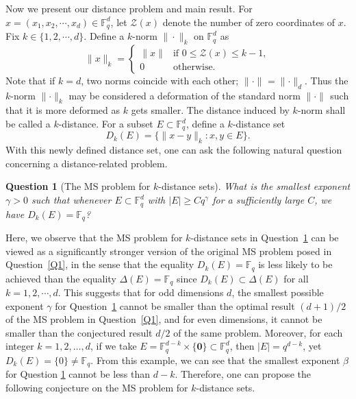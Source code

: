 \documentclass[a4paper,11pt]{amsart}
\numberwithin{equation}{section}
\newtheorem{question}[theorem]{Question}
\def\Fq#1{\mathbb{F}_q^{#1}}
\def\knorm#1#2{\lVert#2\rVert_{#1}}
\begin{document}
Now we present our distance problem and main result.
For $ x = (x_1, x_2, \cdots, x_d) \in \mathbb{F}_q^d $, let $\mathcal{Z}(x)$ denote the number of zero coordinates of $ x $. Fix $k \in \{1, 2, \cdots, d\}$. Define a $k$-norm $\|\cdot\|_{k}$ on $\Fq{d}$ as
\begin{equation}\label{kdst}
\|x\|_{k} = 
\begin{cases}
\|x\| & \text{if } 0 \leq \mathcal{Z}(x) \leq k-1, \\
0 & \text{otherwise.}
\end{cases}
\end{equation}
Note that if $k=d$, two norms coincide with each other; 
$\knorm{}{\cdot} = \knorm{d}{\cdot}$. Thus the $k$-norm $\knorm{k}{\cdot}$ may be considered a deformation of the standard norm $\knorm{}{\cdot}$ such that  it is more deformed as $k$ gets smaller.
The distance induced by $k$-norm shall be called a $k$-distance.
For a subset $E\subset \mathbb F_q^d$, define a $k$-distance set 
\[
D_k(E) = \{\|x - y\|_{k} : x, y \in E\}.
\]
With this newly defined distance set, one can ask the following  natural question concerning a distance-related problem.
\begin{question} [The MS problem for $k$-distance sets]\label{Q2}
    What is the smallest exponent $\gamma > 0$ such that whenever $E\subset \mathbb F_q^d$ with $|E| \geq Cq^{\gamma}$ for a sufficiently large $C$, we have $D_k(E) = \Fq{}$?
\end{question}
Here, we observe that the MS problem for \(k\)-distance sets in Question~\ref{Q2} can be viewed as a significantly stronger version of the original MS problem posed in Question~\ref{Q1}, in the sense that the equality \( D_k(E) = \mathbb{F}_q \) is  less likely to be achieved than the equality \( \Delta(E) = \mathbb{F}_q \) since  $D_k(E) \subset \Delta(E)$ for all $k = 1,2,\cdots,d$.
 This suggests that for odd dimensions \( d \), the smallest possible exponent \( \gamma \) for Question~\ref{Q2} cannot be smaller than the optimal result \( (d+1)/2 \) of the MS problem in Question~\ref{Q1}, and for even dimensions, it cannot be smaller than the conjectured result \( d/2 \) of the same problem. Moreover, for each integer \( k = 1, 2, \ldots, d \), if we take \( E = \mathbb{F}_q^{d-k} \times \{ \mathbf{0}\} \subset \mathbb{F}_q^d \), then \( |E| = q^{d-k} \), yet \( D_k(E) = \{ 0 \} \neq \mathbb{F}_q \). From this example, we can see that the smallest exponent \( \beta \) for Question \ref{Q2} cannot be less than \( d-k \).  Therefore, one can propose the following conjecture on the MS problem for $k$-distance sets.
\end{document}
